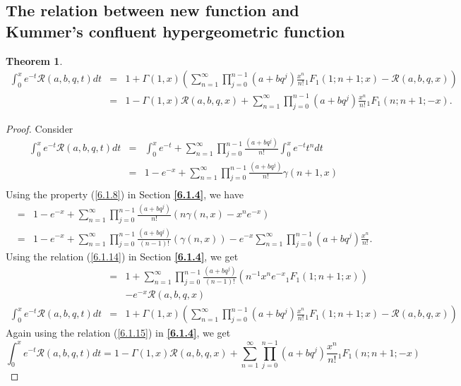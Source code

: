 \documentclass[12pt]{article}
\newtheorem{The}{Theorem}[section]
\numberwithin{equation}{section}
\begin{document}
\subsection{The relation between new function and Kummer's confluent hypergeometric function}
\begin{The}
\begin{eqnarray*}
\int_{0}^xe^{-t}\mathcal{R}(a,b,q,t)dt &=&1 + \Gamma (1, x)\left(\sum_{n=1}^\infty \prod_{j=0}^{n-1}\left(a+bq^j\right)\frac {x^n}{n!} {}_1F_{1}(1; n+1; x) - \mathcal{R}(a,b,q,x)\right)\\
&=& 1 -\Gamma (1, x) \mathcal{R}(a,b,q,x) + \sum_{n=1}^\infty \prod_{j=0}^{n-1}\left(a+bq^j\right)\frac {x^n}{n!} {}_1F_{1}(n; n+1; -x).
\end{eqnarray*}
\end{The}
\begin{proof}
Consider 
\begin{eqnarray}
\int_{0}^xe^{-t}\mathcal{R}(a,b,q,t)dt &=& \int_{0}^xe^{-t} + \sum_{n=1}^\infty  \prod_{j=0}^{n-1}\frac {\left(a+bq^j\right)}{n!} \int_{0}^xe^{-t}t^n dt\\
&=& 1- e^{-x} + \sum_{n=1}^\infty \prod_{j=0}^{n-1}\frac {\left(a+bq^j\right)}{n!} \gamma(n+1,x)\\
\end{eqnarray}
Using the property  (\ref{6.1.8}) in Section \textbf{\ref{6.1.4}}, we have
\begin{eqnarray}
&=& 1- e^{-x} + \sum_{n=1}^\infty \prod_{j=0}^{n-1}\frac {\left(a+bq^j\right)}{n!} \left(n\gamma(n,x)-x^n e^{-x}\right)\\
&=& 1- e^{-x}  + \sum_{n=1}^\infty \prod_{j=0}^{n-1}\frac {\left(a+bq^j\right)}{(n-1)!} \left(\gamma(n,x)\right)-e^{-x}\sum_{n=1}^\infty \prod_{j=0}^{n-1}\left(a+bq^j\right)\frac {x^n}{n!}.
\end{eqnarray}
Using the relation (\ref{6.1.14}) in Section \textbf{\ref{6.1.4}}, we get
\begin{eqnarray}
 &=& 1 + \sum_{n=1}^\infty \prod_{j=0}^{n-1}\frac {\left(a+bq^j\right)}{(n-1)!} \left( n^{-1} x^n e^{-x}{}_1F_{1}(1; n+1; x)\right) \nonumber\\
 &&-e^{-x}\mathcal{R}(a,b,q,x)\\
\int_{0}^xe^{-t}\mathcal{R}(a,b,q,t)dt&=& 1 + \Gamma (1, x)\left(\sum_{n=1}^\infty \prod_{j=0}^{n-1}\left(a+bq^j\right)\frac {x^n}{n!} {}_1F_{1}(1; n+1; x) - \mathcal{R}(a,b,q,x)\right)\nonumber
\end{eqnarray}
Again using the relation (\ref{6.1.15}) in \textbf{\ref{6.1.4}}, we get
\begin{equation}
 \int_{0}^xe^{-t}\mathcal{R}(a,b,q,t)dt= 1 -\Gamma (1, x) \mathcal{R}(a,b,q,x) + \sum_{n=1}^\infty \prod_{j=0}^{n-1}\left(a+bq^j\right)\frac {x^n}{n!} {}_1F_{1}(n; n+1; -x)  \nonumber
\end{equation}
\end{proof}
\end{document}
